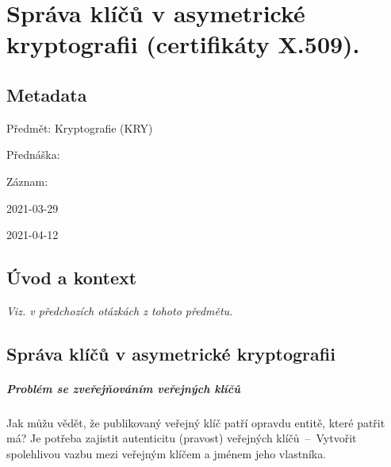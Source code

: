 

\chapter{Správa klíčů v asymetrické kryptografii (certifikáty X.509).}


\section{Metadata}

\begin{compactitem}
    \item Předmět: Kryptografie (KRY)
    \item Přednáška:
    \begin{compactitem}
        \item {}
    \end{compactitem}
    \item Záznam:
    \begin{compactitem}
        \item 2021-03-29
        \item 2021-04-12
    \end{compactitem}
\end{compactitem}


\section{Úvod a kontext}

\textit{Viz.  v předchozích otázkách z tohoto předmětu.}


\section{Správa klíčů v asymetrické kryptografii}

\paragraph*{Problém se zveřejňováním veřejných klíčů} Jak můžu vědět, že publikovaný veřejný klíč patří opravdu entitě, které patřit má? Je potřeba zajistit autenticitu (pravost) veřejných klíčů~--~Vytvořit spolehlivou vazbu mezi veřejným klíčem a jménem jeho vlastníka.

